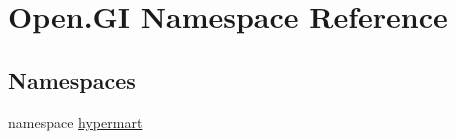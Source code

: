 \hypertarget{namespace_open_1_1_g_i}{}\section{Open.\+G\+I Namespace Reference}
\label{namespace_open_1_1_g_i}
\subsection*{Namespaces}
\begin{DoxyCompactItemize}
\item 
namespace \hyperlink{namespace_open_1_1_g_i_1_1hypermart}{hypermart}
\end{DoxyCompactItemize}
